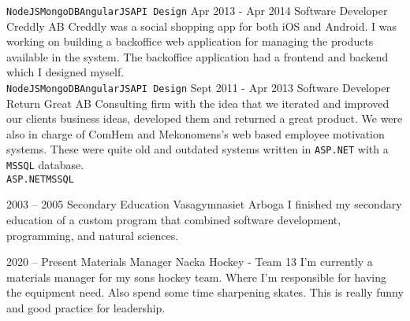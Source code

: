 \documentclass[9pt]{template} %
\begin{document}
\begin{entrylist}
{      \texttt{NodeJS}\slashsep\texttt{MongoDB}\slashsep\texttt{AngularJS}\slashsep\texttt{API Design}}
  \entry
    {Apr 2013 - Apr 2014}
    {Software Developer}
    {Creddly AB}
    {Creddly was a social shopping app for both iOS and Android. I was working on building
      a backoffice web application for managing the products available in the system.
      The backoffice application had a frontend and backend which I designed myself.\\
      \texttt{NodeJS}\slashsep\texttt{MongoDB}\slashsep\texttt{AngularJS}\slashsep\texttt{API Design}}
  \entry
    {Sept 2011 - Apr 2013}
    {Software Developer}
    {Return Great AB}
    {Consulting firm with the idea that we iterated and improved our clients
      business ideas, developed them and returned a great product. We were
      also in charge of ComHem and Mekonomens’s web based employee motivation
      systems. These were quite old and outdated systems written in \texttt{ASP.NET}
      with a \texttt{MSSQL} database.\\
      \texttt{ASP.NET}\slashsep\texttt{MSSQL}}
\end{entrylist}

\pagebreak



\begin{entrylist}
  \entry
    {2003 -- 2005}
    {Secondary Education}
    {Vasagymnasiet Arboga}
    {I finished my secondary education of a custom program that combined
      software development, programming, and natural sciences.}
\end{entrylist}



\begin{entrylist}
  \entry
    {2020 -- Present}
    {Materials Manager}
    {Nacka Hockey - Team 13}
    {I'm currently a materials manager for my sons hockey team. Where I'm
      responsible for having the equipment need. Also spend some time sharpening
      skates. This is really funny and good practice for leadership.}
\end{entrylist}
\end{document}

